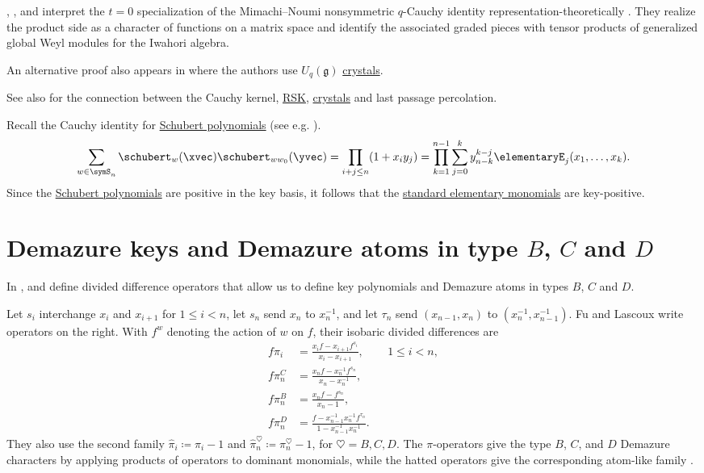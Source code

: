 , , and 
interpret the $t=0$ specialization of the Mimachi--Noumi nonsymmetric
$q$-Cauchy identity representation-theoretically \cite{FeiginMakedonskyiOrr2023x}.
They realize the product side as a character of functions on a matrix space and
identify the associated graded pieces with tensor products of generalized
global Weyl modules for the Iwahori algebra.

An alternative proof also appears in \cite{ChoiKwon2017} where the
authors use $U_q(\mathfrak{g})$ \hyperref[crystals]{crystals}.

See also \cite{AzenhasGobetLecouvey2022x} for the connection between the Cauchy kernel,
\hyperref[rsk]{RSK}, \hyperref[crystals]{crystals} and last passage percolation.


\begin{example}
Recall the Cauchy identity for
\hyperref[schubert]{Schubert polynomials} (see e.g.
\cite[p.~30]{PostnikovStanley2008}).
\[
 \sum_{w \in \symS_n} \schubert_w(\xvec) \schubert_{w w_0}(\yvec) = \prod_{i+j \leq n} (1 + x_iy_j) =
 \prod_{k=1}^{n-1}\sum_{j=0}^k y_{n-k}^{k-j} \elementaryE_{j}(x_1,\dotsc,x_k).
\]
Since the \hyperref[schubert]{Schubert polynomials} are positive in the key basis,
it follows that the \hyperref[schubertAsSumOfElementary]{standard elementary monomials}
are key-positive.
\end{example}




\section[keysAndAtomsTypeBCD]{Demazure keys and Demazure atoms in type $B$, $C$ and $D$}


In \cite{FuLascoux2009},  and  define
divided difference operators that allow us to define key polynomials and
Demazure atoms in types $B$, $C$ and $D$.

Let $s_i$ interchange $x_i$ and $x_{i+1}$ for $1 \leq i < n$, let $s_n$
send $x_n$ to $x_n^{-1}$, and let $\tau_n$ send
$(x_{n-1},x_n)$ to $(x_n^{-1},x_{n-1}^{-1})$.  Fu and Lascoux write
operators on the right.  With $f^w$ denoting the action of $w$ on $f$,
their isobaric divided differences are
\[
\begin{aligned}
f\pi_i
  &= \frac{x_i f-x_{i+1}f^{s_i}}{x_i-x_{i+1}},
    &&1 \leq i < n,\\
f\pi_n^C
  &= \frac{x_n f-x_n^{-1}f^{s_n}}{x_n-x_n^{-1}},\\
f\pi_n^B
  &= \frac{x_n f-f^{s_n}}{x_n-1},\\
f\pi_n^D
  &= \frac{f-x_{n-1}^{-1}x_n^{-1}f^{\tau_n}}
          {1-x_{n-1}^{-1}x_n^{-1}}.
\end{aligned}
\]
They also use the second family
$\widehat{\pi}_i\coloneqq\pi_i-1$ and
$\widehat{\pi}_n^\heartsuit\coloneqq\pi_n^\heartsuit-1$, for
$\heartsuit=B,C,D$.  The $\pi$-operators give the type $B$, $C$, and
$D$ Demazure characters by applying products of operators to dominant
monomials, while the hatted operators give the corresponding atom-like
family \cite[Sec.~3]{FuLascoux2009}.

